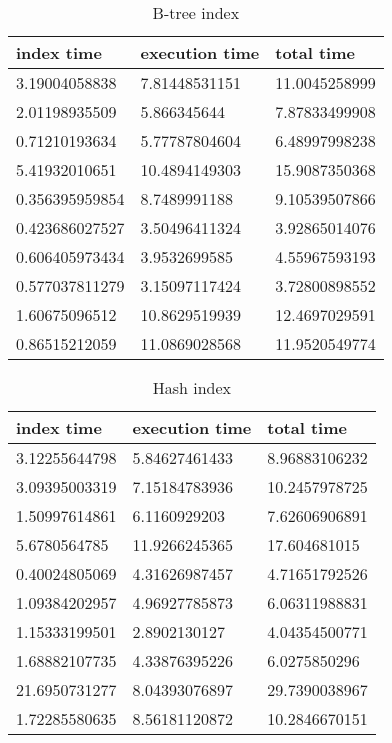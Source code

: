 \begin{itemize*}
\begin{table}[H]
\begin{center}
\begin{tabular}{|l|l|l|}
\hline
index time & execution time & total time                \\ \hline
3.19004058838 & 7.81448531151 & 11.0045258999 \\ \hline
2.01198935509 & 5.866345644 & 7.87833499908 \\ \hline
0.71210193634 & 5.77787804604 & 6.48997998238 \\ \hline
5.41932010651 & 10.4894149303 & 15.9087350368 \\ \hline
0.356395959854 & 8.7489991188 & 9.10539507866 \\ \hline
0.423686027527 & 3.50496411324 & 3.92865014076 \\ \hline
0.606405973434 & 3.9532699585 & 4.55967593193 \\ \hline
0.577037811279 & 3.15097117424 & 3.72800898552 \\ \hline
1.60675096512 & 10.8629519939 & 12.4697029591 \\ \hline
0.86515212059 & 11.0869028568 & 11.9520549774 \\ \hline
\end{tabular}
\end{center}
\caption{B-tree index}
\end{table}

\begin{table}[H]
\begin{center}
\begin{tabular}{|l|l|l|}
\hline
index time & execution time & total time     \\ \hline
3.12255644798 & 5.84627461433 & 8.96883106232 \\ \hline
3.09395003319 & 7.15184783936 & 10.2457978725 \\ \hline
1.50997614861 & 6.1160929203 & 7.62606906891 \\ \hline
5.6780564785 & 11.9266245365 & 17.604681015 \\ \hline
0.40024805069 & 4.31626987457 & 4.71651792526 \\ \hline
1.09384202957 & 4.96927785873 & 6.06311988831 \\ \hline
1.15333199501 & 2.8902130127 & 4.04354500771 \\ \hline
1.68882107735 & 4.33876395226 & 6.0275850296 \\ \hline
21.6950731277 & 8.04393076897 & 29.7390038967 \\ \hline
1.72285580635 & 8.56181120872 & 10.2846670151 \\ \hline
\end{tabular}
\end{center}
\caption{Hash index}
\end{table}


\end{itemize*}
